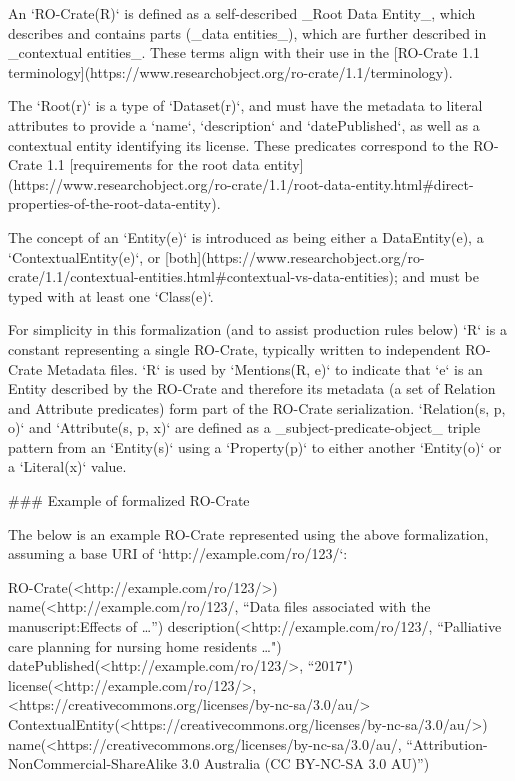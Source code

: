 \begin{markdown}
An `RO-Crate(R)` is defined as a self-described _Root Data Entity_, which describes and contains parts (_data entities_), which are further described in _contextual entities_.  These terms align with their use in the [RO-Crate 1.1 terminology](https://www.researchobject.org/ro-crate/1.1/terminology). 

The `Root(r)` is a type of `Dataset(r)`, and must have the metadata to literal attributes to provide a `name`, `description` and `datePublished`, as well as a contextual entity identifying its license. These predicates correspond to the RO-Crate 1.1 [requirements for the root data entity](https://www.researchobject.org/ro-crate/1.1/root-data-entity.html#direct-properties-of-the-root-data-entity).

The concept of an `Entity(e)` is introduced as being either a DataEntity(e), a `ContextualEntity(e)`, or [both](https://www.researchobject.org/ro-crate/1.1/contextual-entities.html#contextual-vs-data-entities); and must be typed with at least one `Class(e)`. 

For simplicity in this formalization (and to assist production rules below) `R` is a constant representing a single RO-Crate, typically written to independent RO-Crate Metadata files. `R` is used by `Mentions(R, e)` to indicate that `e` is an Entity described by the RO-Crate and therefore its metadata (a set of Relation and Attribute predicates) form part of the RO-Crate serialization. `Relation(s, p, o)` and `Attribute(s, p, x)` are defined as a _subject-predicate-object_ triple pattern from an `Entity(s)` using a `Property(p)` to either another `Entity(o)` or a `Literal(x)` value.
\end{markdown}

\begin{markdown}
### Example of formalized RO-Crate 

The below is an example RO-Crate represented using the above formalization, assuming a base URI of `http://example.com/ro/123/`:
\end{markdown}

    RO-Crate(<http://example.com/ro/123/>)
    name(<http://example.com/ro/123/, 
        “Data files associated with the manuscript:Effects of …”)
    description(<http://example.com/ro/123/, 
        “Palliative care planning for nursing home residents …")
    datePublished(<http://example.com/ro/123/>, “2017")
    license(<http://example.com/ro/123/>, 
        <https://creativecommons.org/licenses/by-nc-sa/3.0/au/>
    ContextualEntity(<https://creativecommons.org/licenses/by-nc-sa/3.0/au/>)
    name(<https://creativecommons.org/licenses/by-nc-sa/3.0/au/, 
        “Attribution-NonCommercial-ShareAlike 3.0 Australia (CC BY-NC-SA 3.0 AU)”)

